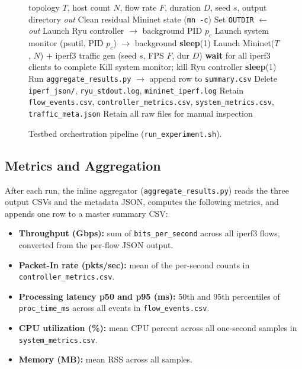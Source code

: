 \documentclass[conference]{IEEEtran}
\begin{document}
\begin{figure}[t]
\begin{algorithmic}[1]
\small
\REQUIRE topology $T$, host count $N$, flow rate $F$,
         duration $D$, seed $s$, output directory \textit{out}
\STATE Clean residual Mininet state (\texttt{mn -c})
\STATE Set \texttt{OUTDIR} $\leftarrow$ \textit{out}
\STATE Launch Ryu controller $\rightarrow$ background PID $p_c$
\STATE Launch system monitor (psutil, PID $p_c$) $\rightarrow$ background
\STATE \textbf{sleep}(1)\hfill{}
\STATE Launch Mininet($T$, $N$) + iperf3 traffic gen (seed $s$, FPS $F$, dur $D$)
\STATE \textbf{wait} for all iperf3 clients to complete
\STATE Kill system monitor; kill Ryu controller
\STATE \textbf{sleep}(1)\hfill{}
\STATE Run \texttt{aggregate\_results.py} $\rightarrow$ append row to \texttt{summary.csv}
  \STATE Delete \texttt{iperf\_json/}, \texttt{ryu\_stdout.log},
         \texttt{mininet\_iperf.log}
  \STATE Retain \texttt{flow\_events.csv}, \texttt{controller\_metrics.csv},
         \texttt{system\_metrics.csv}, \texttt{traffic\_meta.json}
\ELSE
  \STATE Retain all raw files for manual inspection
\ENDIF
\end{algorithmic}
\caption{Testbed orchestration pipeline (\texttt{run\_experiment.sh}).}
\label{alg:pipeline}
\end{figure}

\subsection{Metrics and Aggregation}

After each run, the inline aggregator (\texttt{aggregate\_results.py})
reads the three output CSVs and the metadata JSON, computes
the following metrics, and appends one row to a master
summary CSV:

\begin{itemize}
  \item \textbf{Throughput (Gbps):} sum of \texttt{bits\_per\_second}
  across all iperf3 flows, converted from the per-flow JSON output.
  \item \textbf{Packet-In rate (pkts/sec):} mean of the
  per-second counts in \texttt{controller\_metrics.csv}.
  \item \textbf{Processing latency p50 and p95 (ms):} 50th and
  95th percentiles of \texttt{proc\_time\_ms} across all events
  in \texttt{flow\_events.csv}.
  \item \textbf{CPU utilization (\%):} mean CPU percent across
  all one-second samples in \texttt{system\_metrics.csv}.
  \item \textbf{Memory (MB):} mean RSS across all samples.
\end{itemize}
\end{document}
